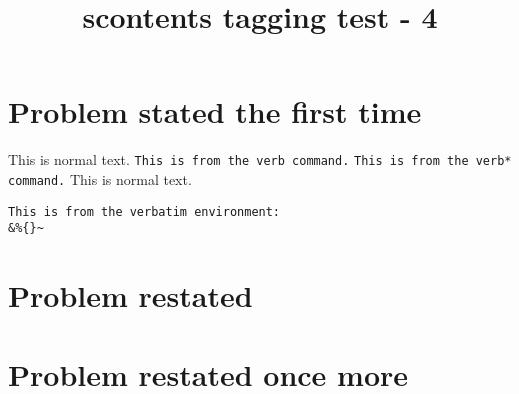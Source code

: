 \documentclass{article}
\title{scontents tagging test - 4}
\begin{document}
\section{Problem stated the first time}
\begin{scontents}[print-env=true,store-env=problem]
This is normal text.
\verb|This is from the verb command.|
\verb*|This is from the verb* command.|
This is normal text.
\begin{verbatim}
This is from the verbatim environment:
&%{}~
\end{verbatim}
\end{scontents}
\section{Problem restated}
\section{Problem restated once more}
\end{document}
